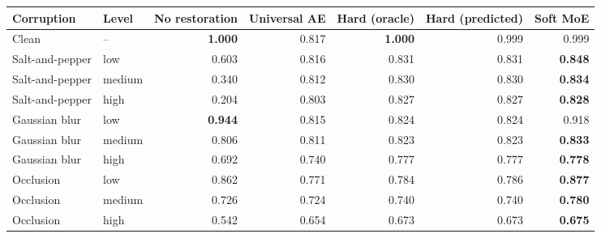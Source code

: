 \begin{tabular}{llrrrrr}
\toprule
Corruption & Level & No restoration & Universal AE & Hard (oracle) & Hard (predicted) & Soft MoE \\
\midrule
Clean & -- & \textbf{1.000} & 0.817 & \textbf{1.000} & 0.999 & 0.999 \\
Salt-and-pepper & low & 0.603 & 0.816 & 0.831 & 0.831 & \textbf{0.848} \\
Salt-and-pepper & medium & 0.340 & 0.812 & 0.830 & 0.830 & \textbf{0.834} \\
Salt-and-pepper & high & 0.204 & 0.803 & 0.827 & 0.827 & \textbf{0.828} \\
Gaussian blur & low & \textbf{0.944} & 0.815 & 0.824 & 0.824 & 0.918 \\
Gaussian blur & medium & 0.806 & 0.811 & 0.823 & 0.823 & \textbf{0.833} \\
Gaussian blur & high & 0.692 & 0.740 & 0.777 & 0.777 & \textbf{0.778} \\
Occlusion & low & 0.862 & 0.771 & 0.784 & 0.786 & \textbf{0.877} \\
Occlusion & medium & 0.726 & 0.724 & 0.740 & 0.740 & \textbf{0.780} \\
Occlusion & high & 0.542 & 0.654 & 0.673 & 0.673 & \textbf{0.675} \\
\bottomrule
\end{tabular}
